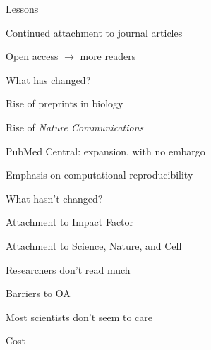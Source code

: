 \documentclass[aspectratio=169,12pt,t]{beamer}
\begin{document}
\begin{frame}{Lessons}

  \bbi
\item Continued attachment to journal articles
\item Open access $\longrightarrow$ more readers
  \ei

  \note{
  }
\end{frame}


\begin{frame}{What has changed?}

  \bbi
\item Rise of preprints in biology
\item Rise of \emph{Nature Communications}
\item PubMed Central: expansion, with no embargo
\item Emphasis on computational reproducibility
  \ei

  \note{
  }
\end{frame}


\begin{frame}{What hasn't changed?}

  \bbi
\item Attachment to Impact Factor
\item Attachment to Science, Nature, and Cell
\item Researchers don't read much
  \ei

\end{frame}


\begin{frame}{Barriers to OA}

  \bbi
\item Most scientists don't seem to care
\item Cost
  \ei

  \note{
  }
\end{frame}
\end{document}

